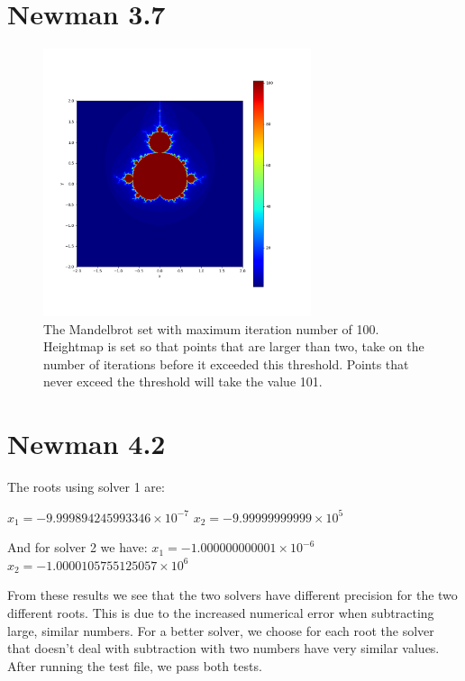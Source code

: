 \documentclass[11pt]{article}
\begin{document}
\section{Newman 3.7}
\begin{figure}[h!]
    \centering
    \includegraphics[width=0.7\textwidth]{fractal.png}
    \caption{The Mandelbrot set with maximum iteration number of 100. Heightmap is set so that points that are larger than two, take on the number of iterations before it exceeded this threshold. Points that never exceed the threshold will take the value 101.   }
    \label{fig:your_label}
\end{figure}

\section{Newman 4.2}
The roots using solver 1 are: 

$x_1=-9.999894245993346 \times 10^{-7}$
$x_2=-9.99999999999 \times 10^{5}$

And for solver 2 we have: 
$x_1=-1.000000000001 \times 10^{-6}$
$x_2=-1.0000105755125057\times10^{6}$


From these results we see that the two solvers have different precision for the two different roots. This is due to the increased numerical error when subtracting large, similar numbers. For a better solver, we choose for each root the solver that doesn't deal with subtraction with two numbers have very similar values. After running the test file, we pass both tests.
\end{document}
